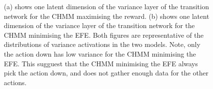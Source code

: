 \documentclass[twoside,11pt]{article}
\begin{document}
\begin{figure}[ht!]
    \caption{(a) shows one latent dimension of the variance layer of the transition network for the CHMM maximising the reward.
             (b) shows one latent dimension of the variance layer of the transition network for the CHMM minimising the EFE.
             Both figures are representative of the distributions of variance activations in the two models.
             Note, only the action down has low variance for the CHMM minimising the EFE.
             This sugguest that the CHMM minimising the EFE always pick the action down, and does not gather enough data for the other actions.
    }
    \label{fig:cka-chmm-trans-sa}
\end{figure}





\end{document}
